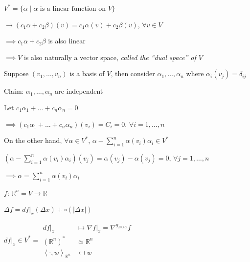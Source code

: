 $V^*=\{\alpha\mid\alpha\text{ is a linear function on }V\}$

$\rightarrow(c_1\alpha+c_2\beta)(v)=c_1\alpha(v)+c_2\beta(v)$, $\forall v\in V$

$\implies c_1\alpha+c_2\beta$ is also linear

$\implies V$ is also naturally a vector space, \emph{called the ``dual space'' of $V$}

Suppose $(v_1,\dots,v_n)$ is a basis of $V$, then consider $\alpha_1,\dots,\alpha_n$ where $\alpha_i(v_j)=\delta_{ij}$

Claim: $\alpha_1,\dots,\alpha_n$ are independent
\begin{pf}
    Let $c_1\alpha_1+\dots+c_n\alpha_n=0$

    $\implies(c_1\alpha_1+\dots+c_n\alpha_n)(v_i)=C_i=0$, $\forall i=1,\dots,n$

    On the other hand, $\forall\alpha\in V^*$, $\alpha-\sum_{i=1}^n\alpha(v_i)\alpha_i\in V^*$

    $(\alpha-\sum_{i=1}^n\alpha(v_i)\alpha_i)(v_j)=\alpha(v_j)-\alpha(v_j)=0$, $\forall j=1,\dots,n$

    $\implies\alpha=\sum_{i=1}^n\alpha(v_i)\alpha_i$
\end{pf}

$f:\,\mathbb{R}^n=V\to\mathbb{R}$

$\Delta f=df|_x(\Delta x)+\circ(|\Delta x|)$

$df|_x\in V^*=\begin{aligned}
        df|_x                               & \mapsto\nabla f|_x=\nabla^{g_{E\cup C}} f \\
        (\mathbb{R}^n)^*                    & \simeq\mathbb{R}^n                        \\
        \left<\cdot,w\right>_{\mathbb{R}^n} & \mapsfrom w
    \end{aligned}$